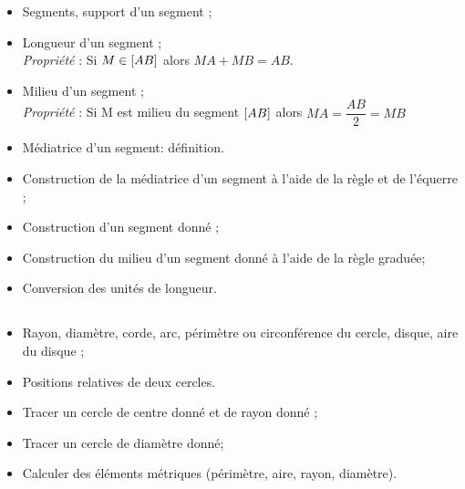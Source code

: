 \savoir
\begin{itemize}
\item Segments, support d'un segment ;
\item Longueur d'un segment ;\\
\textit{Propriété} : Si  $M\in\left[AB\right]$ alors $MA+MB=AB$.
\item Milieu d'un segment ;\\
\textit{Propriété} : Si M est milieu du segment $\left[AB\right]$ alors $MA=\dfrac{AB}{2}=MB$
\item Médiatrice d'un segment: définition.
\end{itemize}
\savoirfaire
\begin{itemize}
\item Construction de la médiatrice d'un segment à l'aide de la règle et de l'équerre ;
\item Construction d'un segment donné ;
\item Construction du milieu d'un segment donné à l'aide de la règle graduée;
\item Conversion des unités de longueur.
\end{itemize}

\newpage

\subsection*{}

\savoir
\begin{itemize}
\item Rayon, diamètre, corde, arc, périmètre ou circonférence du cercle, disque, aire du disque ;
\item Positions relatives de deux cercles.
\end{itemize}
\savoirfaire
\begin{itemize}
\item Tracer un cercle de centre donné et de rayon donné ; 
\item Tracer un cercle de diamètre donné;
\item Calculer des éléments métriques (périmètre, aire, rayon, diamètre).
\end{itemize}

\subsection*{}

